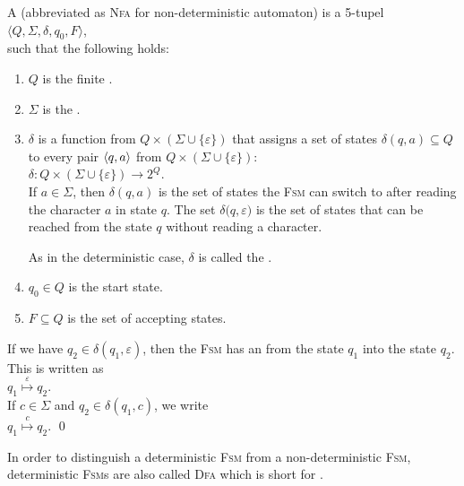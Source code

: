 \begin{Definition}[NFA]
A  
(abbreviated as \textsc{Nfa} for non-deterministic automaton) 
is a  5-tupel  
\\[0.2cm]
\hspace*{1.3cm}
$\langle Q, \Sigma, \delta, q_0, F\rangle$,
\\[0.2cm]
such that the following holds:
\begin{enumerate}
\item $Q$ is the finite .
\item $\Sigma$ is the .
\item $\delta$ is a function from $Q \times (\Sigma \cup \{ \varepsilon \})$ that assigns a set of states
      $\delta(q, a) \subseteq Q$ to every pair $\pair(q, a)$ from $Q \times (\Sigma \cup \{ \varepsilon \})$:
      \\[0.2cm]
      \hspace*{1.3cm}
      $\delta: Q \times (\Sigma \cup \{\varepsilon\}) \rightarrow 2^Q$.
      \\[0.2cm]
      If $a \in \Sigma$, then $\delta(q, a)$ is the set of states the \textsc{Fsm} can switch to
      after reading the character $a$ in state $q$.  The set $\delta\bigl(q, \varepsilon)$ is the
      set of states that can be reached from the state $q$ without reading a character.
      
      As in the deterministic case, $\delta$ is called the .
\item $q_0 \in Q$ is the start state.
\item $F \subseteq Q$ is the set of accepting states. 
\end{enumerate}
If we have $q_2 \in \delta(q_1, \varepsilon)$, then the \textsc{Fsm} has an
 from the state $q_1$ into the state $q_2$.  This is written as
\\[0.2cm]
\hspace*{1.3cm}
$q_1 \stackrel{\varepsilon}{\mapsto} q_2$.
\\[0.2cm]
If  $c \in \Sigma$ and  $q_2 \in \delta(q_1, c)$, we write
\\[0.2cm]
\hspace*{1.3cm}
$q_1 \stackrel{c}{\mapsto} q_2$. \qed
\end{Definition}

In order to distinguish a deterministic \textsc{Fsm} from a non-deterministic \textsc{Fsm}, deterministic
\textsc{Fsm}s are also called \textsc{Dfa}  which is short for 
. 


